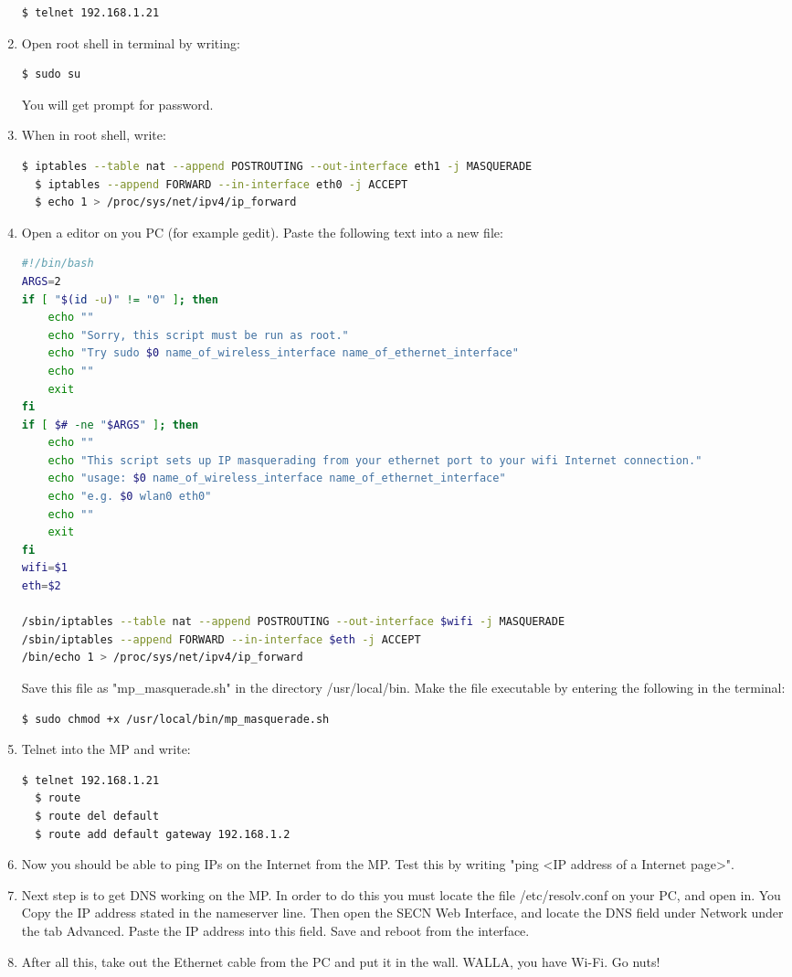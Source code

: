 \begin{enumerate}
\begin{lstlisting}[language=bash]
  $ telnet 192.168.1.21
\end{lstlisting}
\item Open root shell in terminal by writing: 
\noindent
\begin{lstlisting}[language=bash]
  $ sudo su
\end{lstlisting}
You will get prompt for password. 
\item When in root shell, write: 
\noindent
\begin{lstlisting}[language=bash]
  $ iptables --table nat --append POSTROUTING --out-interface eth1 -j MASQUERADE
  $ iptables --append FORWARD --in-interface eth0 -j ACCEPT
  $ echo 1 > /proc/sys/net/ipv4/ip_forward
\end{lstlisting}
\item Open a editor on you PC (for example gedit). Paste the following text into a new file: 
\begin{framed}
\noindent
\begin{lstlisting}[language=bash]
#!/bin/bash
ARGS=2
if [ "$(id -u)" != "0" ]; then
    echo ""
    echo "Sorry, this script must be run as root."
    echo "Try sudo $0 name_of_wireless_interface name_of_ethernet_interface"
    echo ""
    exit
fi
if [ $# -ne "$ARGS" ]; then 
    echo ""
    echo "This script sets up IP masquerading from your ethernet port to your wifi Internet connection."
    echo "usage: $0 name_of_wireless_interface name_of_ethernet_interface"
    echo "e.g. $0 wlan0 eth0"
    echo ""
    exit
fi
wifi=$1
eth=$2

/sbin/iptables --table nat --append POSTROUTING --out-interface $wifi -j MASQUERADE
/sbin/iptables --append FORWARD --in-interface $eth -j ACCEPT
/bin/echo 1 > /proc/sys/net/ipv4/ip_forward
\end{lstlisting}
\end{framed}

Save this file as "mp_masquerade.sh" in the directory /usr/local/bin. Make the file executable by entering the following in the terminal:
\noindent
\begin{lstlisting}[language=bash]
  $ sudo chmod +x /usr/local/bin/mp_masquerade.sh
\end{lstlisting}
\item Telnet into the MP and write:
\noindent
\begin{lstlisting}[language=bash]
  $ telnet 192.168.1.21
  $ route 
  $ route del default
  $ route add default gateway 192.168.1.2
\end{lstlisting}
\item Now you should be able to ping IPs on the Internet from the MP. Test this by writing "ping <IP address of a Internet page>". 
\item Next step is to get DNS working on the MP. In order to do this you must locate the file /etc/resolv.conf on your PC, and open in. You Copy the IP address stated in the nameserver line. Then open the SECN Web Interface, and locate the DNS field under Network under the tab Advanced. Paste the IP address into this field. Save and reboot from the interface. 
\item After all this, take out the Ethernet cable from the PC and put it in the wall. WALLA, you have Wi-Fi. Go nuts!
\end{enumerate}